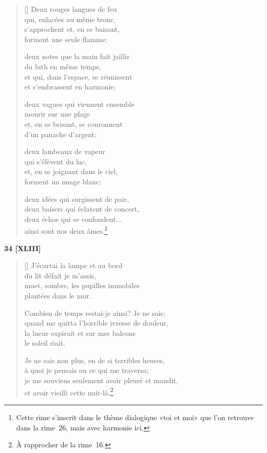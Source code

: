 \documentclass[a4paper,12pt]{book}
\begin{document}
\begin{verse}[\versewidth]
  Deux rouges langues de feu \\
  qui, enlacées au même tronc, \\
  s'approchent et, en se baisant, \\
  forment une seule flamme;

  deux notes que la main fait jaillir \\
  du luth en même temps, \\
  et qui, dans l'espace, se réunissent \\
  et s'embrassent en harmonie;

  deux vagues qui viennent ensemble \\
  mourir sur une plage \\
  et, en se brisant, se couronnent \\
  d'un panache d'argent;

  deux lambeaux de vapeur \\
  qui s'élèvent du lac, \\
  et, en se joignant dans le ciel, \\
  forment un nuage blanc;

  deux idées qui surgissent de pair, \\
  deux baisers qui éclatent de concert, \\
  deux échos qui se confondent... \\
  ainsi sont nos deux âmes.\footnote{Cette rime s'inscrit dans le
  thème dialogique «toi et moi» que l'on retrouve dans la rime~26,
  mais avec harmonie ici.}
\end{verse}

\bigskip

\begin{center}
  \textbf{34 [XLIII]}
\end{center}

\settowidth{\versewidth}{je me souviens seulement avoir pleuré et maudit,}

\begin{verse}[\versewidth]
  J'écartai la lampe et au bord \\
  du lit défait je m'assis, \\
  muet, sombre, les pupilles immobiles \\
  plantées dans le mur.

  Combien de temps restai-je ainsi? Je ne sais; \\
  quand me quitta l'horrible ivresse de douleur, \\
  la lueur expirait et sur mes balcons \\
  le soleil riait.

  Je ne sais non plus, en de si terribles heures, \\
  à quoi je pensais ou ce qui me traversa; \\
  je me souviens seulement avoir pleuré et maudit, \\
  et avoir vieilli cette nuit-là.\footnote{À rapprocher de la rime~16.}
\end{verse}
\end{document}
